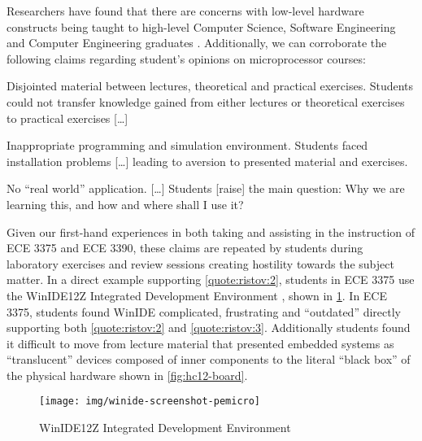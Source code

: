 Researchers have found that there are concerns with low-level hardware constructs being taught to high-level Computer Science, Software Engineering and Computer Engineering graduates \cite{Ristov2011, Stolikj2011}. Additionally, we can corroborate the following claims regarding student's opinions on microprocessor courses: 
\begin{displayquote}
    \begin{observations}
        \item Disjointed material between lectures, theoretical and practical
        exercises. Students could not transfer knowledge gained from either lectures or theoretical exercises to practical exercises [\dots] 
            \label{quote:ristov:1}
        \item Inappropriate programming and simulation environment. Students faced installation problems [\dots] leading to aversion to presented material and exercises.
            \label{quote:ristov:2}
        \item No ``real world'' application. [\dots] Students [raise] the main question: Why we are learning this, and how and where shall I use it?
            \label{quote:ristov:3}
    \end{observations}
\end{displayquote}
Given our first-hand experiences in both taking and assisting in the instruction of ECE 3375 and ECE 3390, these claims are repeated by students during laboratory exercises and review sessions creating hostility towards the subject matter. In a direct example supporting \cref{quote:ristov:2}, students in ECE 3375 use the WinIDE12Z Integrated Development Environment \cite{winide}, shown in \cref{fig:winide-screenshot-pemicro}. In ECE 3375, students found WinIDE complicated, frustrating and ``outdated'' \cite{evals:ece3375-2013, evals:ece3375-2014} directly supporting both \cref{quote:ristov:2} and \cref{quote:ristov:3}. Additionally students found it difficult to move from lecture material that presented embedded systems as ``translucent'' devices composed of inner components to the literal ``black box'' of the physical hardware shown in \cref{fig:hc12-board}. 

\begin{figure}[bh!]
    \centering
    \texttt{[image: img/winide-screenshot-pemicro]}
    \caption{WinIDE12Z Integrated Development Environment \cite{winide-screenshot}}
    \label{fig:winide-screenshot-pemicro}
\end{figure}

